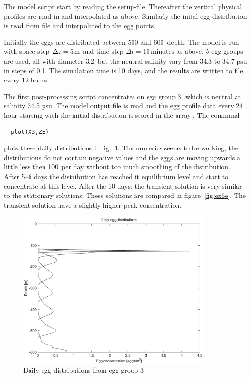 The model script start by reading the setup-file. Thereafter the
vertical physical profiles are read in and interpolated as above.
Similarly the inital egg distribution is read from file
 and interpolated to the egg points. 

Initially the eggs are distributed between 500 and 600\m\ depth.
The model is run with space step $\Delta z = 5\, \mbox{m}$ and time
step $\Delta t = 10\, \text{minutes}$ as above. 5 egg groups are used,
all with diameter 3.2\mm\ but the neutral salinity vary from 34.3 to
34.7 psu in steps of 0.1. The simulation time is 10 days, and the
results are written to file every 12 hours.

The first post-processing script  concentrates on egg
group 3, which is neutral at salinity 34.5 psu.  The model output file
 is read and the egg profile data every 24 hour
starting with the initial distribution is 
stored in the array . The command
\begin{verbatim}
  plot(X3,ZE)
\end{verbatim}
plots these daily distributions in fig.~\ref{fig:ex6d}. The numerics
seems to be working, the distributions do not contain negative values
and the eggs are moving upwards a little less then 100\m\ per day
without too much smoothing of the distribution. After 5--6 days the
distribution has reached it equilibrium level and start to concentrate
at this level. After the 10 days, the transient solution is very
similar to the stationary solutions. These solutions are compared in
figure~\ref{fig:ex6e}. The transient solution have a slightly higher
peak consentration.

\begin{figure}[!htb]
\begin{center}
\includegraphics[height=8cm]{ex6d}
\end{center}
\caption{Daily egg distributions from egg group 3}
\label{fig:ex6d}
\end{figure}

